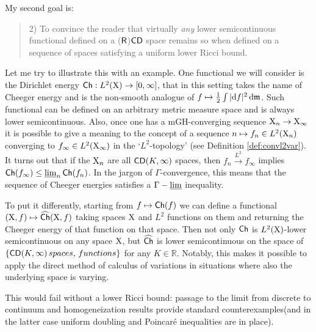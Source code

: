 \documentclass[11pt]{article}
\numberwithin{equation}{section}
\newcommand{\R}{\mathbb{R}}
\newcommand{\X}{{\rm X}}
\newcommand{\mm}{{\mathfrak m}}
\newcommand{\CD}{{\sf CD}}
\newcommand{\ch}{{\sf Ch}}
\renewcommand{\d}{{\rm d}}
\newcommand{\limi}{\varliminf}
\DeclareMathOperator*{\glimi}{{\Gamma-\limi}}
\begin{document}
My second goal is:
\begin{quote}
2) To convince the reader that virtually \emph{any} lower semicontinuous functional defined on a (${\sf R}$)$\CD$ space remains so when defined  on a sequence of spaces satisfying a uniform lower Ricci bound.
\end{quote}
Let me try to illustrate this with an example. One functional we will consider is the Dirichlet energy $\ch:L^2(\X)\to[0,\infty]$, that in this setting takes the name of Cheeger energy and is the non-smooth analogue of $f\mapsto \tfrac12\int|\d f|^2\,\d\mm$. Such functional can be defined on an arbitrary metric measure space and is always lower semicontinuous. Also, once one has a mGH-converging sequence $\X_n\to\X_\infty$ it is possible to give a meaning to the concept of a sequence $n\mapsto f_n\in L^2(\X_n)$ converging to $f_\infty\in L^2(\X_\infty)$ in the `$L^2$-topology' (see Definition \ref{def:convl2var}). It turns out that if the $\X_n$ are all $\CD(K,\infty)$ spaces, then $f_n\stackrel{L^2}\to f_\infty$ implies $\ch(f_\infty)\leq\limi_n\ch(f_n)$. In the jargon of $\Gamma$-convergence, this means that the sequence of Cheeger energies satisfies a $\glimi$ inequality.

To put it differently, starting from $f\mapsto \ch(f)$ we can define a functional $(\X,f)\mapsto \widehat\ch(\X,f)$ taking spaces $\X$ and $L^2$ functions on them and returning the Cheeger energy of that function on that space. Then not only $\ch$ is $L^2(\X)$-lower semicontinuous on any space $\X$, but $\widehat\ch$ is lower semicontinuous on the space of $\{\CD(K,\infty)\, spaces,\, functions\}$ for any $K\in\R$. Notably, this makes it possible to apply the direct method of calculus of variations in situations where also the underlying space is varying.


This would fail without a lower Ricci bound: passage to the limit from discrete to continuum and homogeneization results provide standard counterexamples\footnotemark (and in the latter case uniform doubling and Poincar\'e inequalities are in place).
\end{document}
